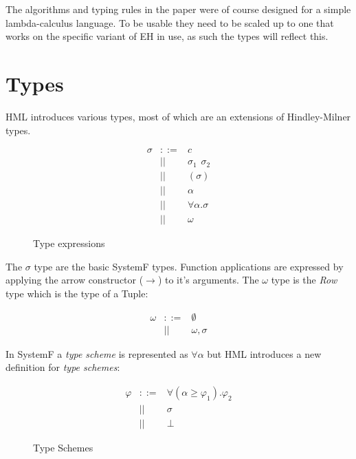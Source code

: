 The algorithms and typing rules in the paper were of course designed for a simple lambda-calculus language. To be usable they need to be scaled up to one that works on the specific variant of EH in use, as such the types will reflect this.
\section{Types}
\label{sec:Types}
HML introduces various types, most of which are an extensions of Hindley-Milner types. 

\begin{figure}[H]
\begin{eqnarray*}
\sigma & ::= & c \\ 
       & || & \sigma_1 \hspace{5pt} \sigma_2 \\
       & || & (\sigma) \\ 
       & || & \alpha \\ 
       & || & \forall \alpha . \sigma \\
       & || & \omega
\end{eqnarray*}
\caption{Type expressions}
\label{types}
\end{figure}

The $\sigma$ type are the basic SystemF types. Function applications are expressed by applying the arrow constructor ($\rightarrow$) to it's arguments. The $\omega$ type is the \emph{Row} type which is the type of a Tuple:

\begin{eqnarray*}
\omega & ::= & \emptyset \\
       & || & \omega , \sigma
\end{eqnarray*}

In SystemF a \emph{type scheme} is represented as $\forall \alpha$ but HML introduces a new definition for \emph{type schemes}:

\begin{figure}[H]
\begin{eqnarray*}
\varphi & ::= & \forall (\alpha \geq \varphi_1). \varphi_2 \\
        & || & \sigma \\
        & || & \bot
\end{eqnarray*}
\caption{Type Schemes}
\label{type-schemes}
\end{figure}

